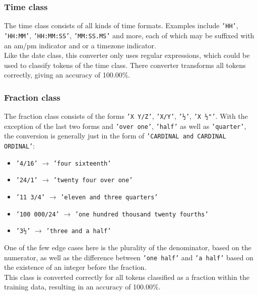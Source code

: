 \documentclass[a4paper, 9pt]{extarticle}
\newcommand{\str}[1]{\texttt{'#1'}}
\begin{document}
\subsubsection{Time class}
The time class consists of all kinds of time formats. Examples include \str{HH}, \str{HH:MM}, \str{HH:MM:SS}, \str{MM:SS.MS} and more, each of which may be suffixed with an am/pm indicator and or a timezone indicator.\\
Like the date class, this converter only uses regular expressions, which could be used to classify tokens of the time class. There converter transforms all tokens correctly, giving an accuracy of 100.00\%.

\subsubsection{Fraction class}
The fraction class consists of the forms \str{X Y/Z}, \str{X/Y}, \str{½}, \str{X ½"}. With the exception of the last two forms and \str{over one}, \str{half} as well as \str{quarter}, the conversion is generally just in the form of \str{CARDINAL and CARDINAL ORDINAL}:
\begin{itemize}
    \itemsep-0.3em
    \item \str{4/16} $\to$ \str{four sixteenth}
    \item \str{24/1} $\to$ \str{twenty four over one}
    \item \str{11 3/4} $\to$ \str{eleven and three quarters}
    \item \str{100 000/24} $\to$ \str{one hundred thousand twenty fourths}
    \item \str{3½} $\to$ \str{three and a half}
\end{itemize}
One of the few edge cases here is the plurality of the denominator, based on the numerator, as well as the difference between \str{one half} and \str{a half} based on the existence of an integer before the fraction.\\
This class is converted correctly for all tokens classified as a fraction within the training data, resulting in an accuracy of 100.00\%.
\end{document}
